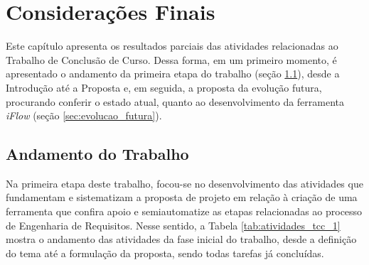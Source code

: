 \chapter[Considerações Finais]{Considerações Finais}

\label{chap:consideracoes_finais}

Este capítulo apresenta os resultados parciais das atividades relacionadas ao Trabalho de Conclusão de Curso. Dessa forma, em um primeiro momento, é apresentado o andamento da primeira etapa do trabalho (seção \ref{sec:andamento_do_trabalho}), desde a Introdução até a Proposta e, em seguida, a proposta da evolução futura, procurando conferir o estado atual, quanto ao desenvolvimento da ferramenta \textit{iFlow} (seção \ref{sec:evolucao_futura}).

\section{Andamento do Trabalho}

\label{sec:andamento_do_trabalho}

Na primeira etapa deste trabalho, focou-se no desenvolvimento das atividades que fundamentam e sistematizam a proposta de projeto em relação à criação de uma ferramenta que confira apoio e semiautomatize as etapas relacionadas ao processo de Engenharia de Requisitos. Nesse sentido, a Tabela \ref{tab:atividades_tcc_1} mostra o andamento das atividades da fase inicial do trabalho, desde a definição do tema até a formulação da proposta, sendo todas tarefas já concluídas.

\begin{table}[H]
    \centering
    \caption{Andamento das atividades do TCC1}
    \label{tab:atividades_tcc_1}
\end{table}

